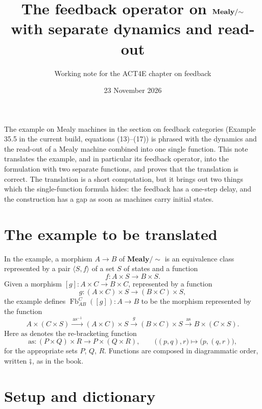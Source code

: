 \documentclass[11pt,a4paper]{article}
\title{The feedback operator on $\MealyMod$\\ with separate dynamics and read-out}
\author{Working note for the ACT4E chapter on feedback}
\date{23 November 2026}
\theoremstyle{plain}
\theoremstyle{remark}
\DeclareMathOperator{\Fb}{Fb}
\newcommand{\as}{\mathrm{as}}
\newcommand{\then}{\mathbin{\fatsemi}}
\newcommand{\MealyMod}{\mathbf{Mealy}/{\sim}}
\begin{document}
\maketitle

\noindent
The example on Mealy machines in the section on feedback categories (Example 35.5 in the current build, equations (13)--(17)) is phrased with the dynamics and the read-out of a Mealy machine combined into one single function.
This note translates the example, and in particular its feedback operator, into the formulation with two separate functions, and proves that the translation is correct.
The translation is a short computation, but it brings out two things which the single-function formula hides: the feedback has a one-step delay, and the construction has a gap as soon as machines carry initial states.

\section{The example to be translated}

In the example, a morphism $A \to B$ of $\MealyMod$ is an equivalence class represented by a pair $\langle S, f \rangle$ of a set $S$ of states and a function
\begin{equation}
    f \colon A \times S \to B \times S .
\end{equation}
Given a morphism $[g] \colon A \times C \to B \times C$, represented by a function
\begin{equation}
    \label{eq:g}
    g \colon (A \times C) \times S \to (B \times C) \times S ,
\end{equation}
the example defines $\Fb_{A B}^{C}([g]) \colon A \to B$ to be the morphism represented by the function
\begin{equation}
    \label{eq:h}
    A \times (C \times S) \xrightarrow{\ \as^{-1}\ } (A \times C) \times S \xrightarrow{\ g\ } (B \times C) \times S \xrightarrow{\ \as\ } B \times (C \times S) .
\end{equation}
Here $\as$ denotes the re-bracketing function
\begin{equation}
    \as \colon (P \times Q) \times R \to P \times (Q \times R), \qquad \bigl((p, q), r\bigr) \mapsto \bigl(p, (q, r)\bigr),
\end{equation}
for the appropriate sets $P$, $Q$, $R$.
Functions are composed in diagrammatic order, written $\then$, as in the book.

\section{Setup and dictionary}
\end{document}
